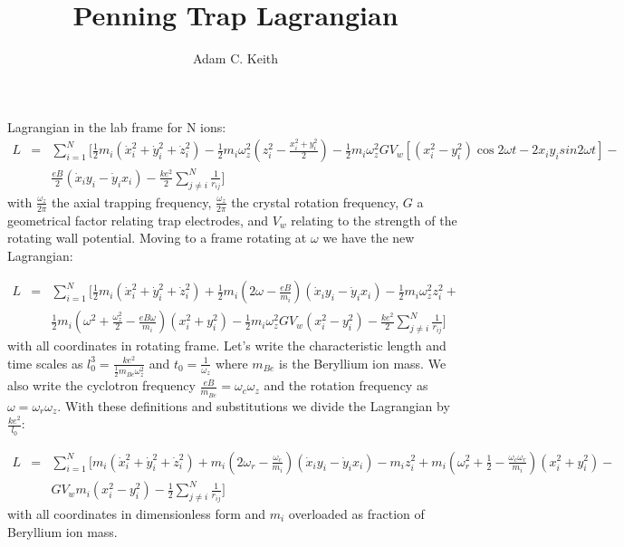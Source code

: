 \documentclass[12pt]{article}
\begin{document}
\title{Penning Trap Lagrangian}
\author{Adam C. Keith}
\maketitle
Lagrangian in the lab frame for N ions:
\begin{eqnarray}
L &=& \sum^N_{i=1} \Bigg[\frac{1}{2} m_i \left(\dot{x}_i^2 + \dot{y}_i^2 + \dot{z}_i^2 \right) - \frac{1}{2} m_i \omega_z^2 \left(z_i^2 - \frac{x_i^2 + y_i^2}{2} \right) - \frac{1}{2}  m_i \omega_z^2  G V_w  \left[\left(x_i^2 - y_i^2 \right)\cos{2\omega t} - 2 x_i y_i sin{2\omega t}\right] - \nonumber \\
&&  \frac{eB}{2} \left(\dot{x}_i y_i - \dot{y}_i x_i \right) - \frac{ke^2}{2} \sum^N_{j \neq i}\frac{1}{r_{ij}} \Bigg]
\end{eqnarray}
with $\frac{\omega_z}{2\pi}$ the axial trapping frequency, $\frac{\omega_z}{2\pi}$ the crystal rotation frequency, $G$ a geometrical factor relating trap electrodes, and $V_w$ relating to the strength of the rotating wall potential. Moving to a frame rotating at $\omega$ we have the new Lagrangian:

\begin{eqnarray}
L &=& \sum^N_{i=1} \Bigg[\frac{1}{2} m_i \left(\dot{x}_i^2 + \dot{y}_i^2 + \dot{z}_i^2 \right) +  \frac{1}{2} m_i \left(2\omega - \frac{eB}{m_i}\right) \left(\dot{x}_i y_i - \dot{y}_i x_i \right) - \frac{1}{2}m_i\omega_z^2 z_i^2 +
 \nonumber \\
&&  \frac{1}{2} m_i \left(\omega^2 + \frac{\omega_z^2}{2} - \frac{eB\omega}{m_i} \right) \left(x_i^2+y_i^2\right) - \frac{1}{2}  m_i \omega_z^2  G V_w  \left(x_i^2 - y_i^2 \right) - \frac{ke^2}{2} \sum^N_{j \neq i}\frac{1}{r_{ij}} \Bigg]
\end{eqnarray}
with all coordinates in rotating frame. Let's write the characteristic length and time scales as $l_0^3 = \frac{ke^2}{\frac{1}{2}m_{Be} \omega_z^2}$ and $t_0 = \frac{1}{\omega_z}$ where $m_{Be}$ is the Beryllium ion mass. We also write the cyclotron frequency $\frac{eB}{m_{Be}} = \omega_c \omega_z$ and the rotation frequency as $\omega = \omega_r \omega_z$. With these definitions and substitutions we divide the Lagrangian by $\frac{ke^2}{l_0}$:

\begin{eqnarray}
L &=& \sum^N_{i=1} \Bigg[m_i \left(\dot{x}_i^2 + \dot{y}_i^2 + \dot{z}_i^2 \right) +  m_i \left(2\omega_r - \frac{\omega_c}{m_i} \right) \left(\dot{x}_i y_i - \dot{y}_i x_i \right) - m_i z_i^2 + m_i \left(\omega_r^2  + \frac{1}{2} - \frac{\omega_c \omega_r}{m_i} \right) \left(x_i^2+y_i^2\right) - \nonumber \\
&&  G V_w m_i \left(x_i^2 - y_i^2 \right) - \frac{1}{2} \sum^N_{j \neq i}\frac{1}{r_{ij}} \Bigg]
\end{eqnarray}
with all coordinates in dimensionless form and $m_i$ overloaded as fraction of Beryllium ion mass.
\end{document}
